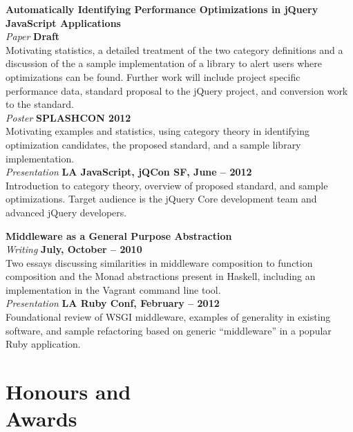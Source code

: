 \documentclass[margin,line]{resume}
\begin{document}
\begin{resume}
    \textbf{Automatically Identifying Performance Optimizations in jQuery JavaScript Applications}\\
    \textsl{Paper} \hfill \textbf{Draft}\\
    Motivating statistics, a detailed treatment of the two category definitions and a discussion of the a sample implementation of a library to alert users where optimizations can be found. Further work will include project specific performance data, standard proposal to the jQuery project, and conversion work to the standard.
    \vspace{1mm}\\
    \textsl{Poster} \hfill \textbf{SPLASHCON 2012}\\
    Motivating examples and statistics, using category theory in identifying optimization candidates, the proposed standard, and a sample library implementation.
    \vspace{1mm}\\
    \textsl{Presentation} \hfill \textbf{LA JavaScript, jQCon SF, June -- 2012}\\
    Introduction to category theory, overview of proposed standard, and sample optimizations. Target audience is the jQuery Core development team and advanced jQuery developers.


    \textbf{Middleware as a General Purpose Abstraction}\\
    \textsl{Writing} \hfill \textbf{July, October -- 2010}\\
    Two essays discussing similarities in middleware composition to function composition and the Monad abstractions present in Haskell, including an implementation in the Vagrant command line tool.
    \vspace{1mm}\\
    \textsl{Presentation} \hfill \textbf{LA Ruby Conf, February -- 2012}\\
    Foundational review of WSGI middleware, examples of generality in existing software, and sample refactoring based on generic ``middleware'' in a popular Ruby application.

    \section{\mysidestyle Honours and\\Awards}


\end{resume}
\end{document}
